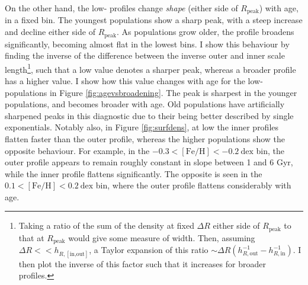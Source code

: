 On the other hand, the low-\afe{} profiles change \emph{shape} (either side of $R_{\mathrm{peak}}$) with age, in a fixed \feh{} bin. The youngest populations show a sharp peak, with a steep increase and decline either side of $R_{\mathrm{peak}}$. As populations grow older, the profile broadens significantly, becoming almost flat in the lowest \feh{} bins. I show this behaviour by finding the inverse of the difference between the inverse outer and inner scale length\footnote{Taking a ratio of the sum of the density at fixed $\Delta R$ either side of $R_{\mathrm{peak}}$ to that at $R_{\mathrm{peak}}$ would give some measure of width. Then, assuming $\Delta R << h_{R,[\text{in,out}]}$, a Taylor expansion of this ratio $\sim \Delta R (h_{R,\text{out}}^{-1}-h_{R,\text{in}}^{-1})$. I then plot the inverse of this factor such that it increases for broader profiles.}, such that a low value denotes a sharper peak, whereas a broader profile has a higher value. I show how this value changes with age for the low-\afe{} populations in Figure \ref{fig:agevsbroadening}. The peak is sharpest in the younger populations, and becomes broader with age. Old populations have artificially sharpened peaks in this diagnostic due to their being better described by single exponentials. Notably also, in Figure \ref{fig:surfdens}, at low \feh{} the inner profiles flatten faster than the outer profile, whereas the higher \feh{} populations show the opposite behaviour. For example, in the $-0.3 < \mathrm{[Fe/H]} < -0.2\ \mathrm{dex}$ bin, the outer profile appears to remain roughly constant in slope between 1 and 6 Gyr, while the inner profile flattens significantly. The opposite is seen in the $0.1 < \mathrm{[Fe/H]} < 0.2\ \mathrm{dex}$ bin, where the outer profile flattens considerably with age. 


